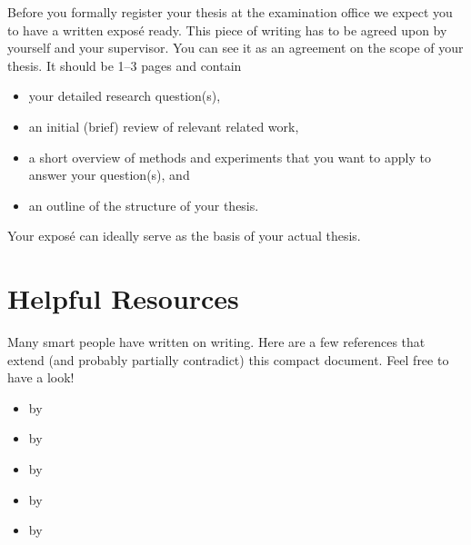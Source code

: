 \documentclass[twocolumn]{mlai-guide}
\begin{document}
Before you formally register your thesis at the examination office we expect you to have a written expos\'{e} ready.
This piece of writing has to be agreed upon by yourself and your supervisor.
You can see it as an agreement on the scope of your thesis. 
It should be 1--3 pages and contain 
\begin{itemize}
\item your detailed research question(s),
\item an initial (brief) review of relevant related work,
\item a short overview of methods and experiments that you want to apply to answer your question(s), and
\item an outline of the structure of your thesis.
\end{itemize} 
Your expos\'{e} can ideally serve as the basis of your actual thesis.



\section{Helpful Resources} \label{sec:helpful-resources} 

Many smart people have written on writing. 
Here are a few references that extend (and probably partially contradict) this compact document.
Feel free to have a look!

\begin{itemize}
       \item {} by \textcite{keshav_how_to_read}
       \item {} by \textcite{zobel_writing}
       \item {} by \textcite{knuth_mathematical_writing}
       \item {} by \textcite{winston_how_to_speak}
       \item {} by \textcite{strunkwhite}
\end{itemize}{}

 

\end{document}
